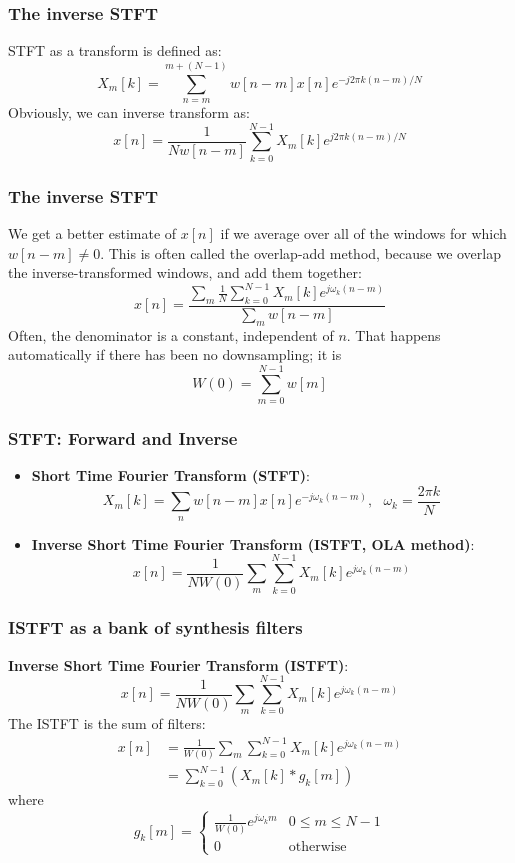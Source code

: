\documentclass{beamer}
\begin{document}
\begin{frame}
  \frametitle{The inverse STFT}
  STFT as a transform is defined as:
  \[
  X_m[k]= \sum_{n=m}^{m+(N-1)} w[n-m]x[n]e^{-j2\pi k(n-m)/N}
  \]
  Obviously, we can inverse transform as:
  \[
  x[n] = \frac{1}{N w[n-m]}\sum_{k=0}^{N-1} X_m[k]e^{j2\pi k(n-m)/N}
  \]
\end{frame}
\begin{frame}
  \frametitle{The inverse STFT}

  We get a better estimate of $x[n]$ if we average over all of the
  windows for which $w[n-m]\ne 0$.  This is often called the
  overlap-add method, because we overlap the inverse-transformed
  windows, and add them together:
  \[
  x[n] = \frac{\sum_m\frac{1}{N}\sum_{k=0}^{N-1} X_m[k]e^{j\omega_k (n-m)}}{\sum_mw[n-m]}
  \]
  Often, the denominator is a constant, independent of $n$.  That
  happens automatically if there has been no downsampling; it is
  \[
  W(0)=\sum_{m=0}^{N-1} w[m]
  \]
\end{frame}

\begin{frame}
  \frametitle{STFT: Forward and Inverse}
  \begin{itemize}
  \item {\bf Short Time Fourier Transform (STFT)}:
    \[
    X_m[k]= \sum_n w[n-m]x[n]e^{-j\omega_k (n-m)},~~~\omega_k=\frac{2\pi k}{N}
    \]
  \item {\bf Inverse Short Time Fourier Transform (ISTFT, OLA method)}:
    \[
    x[n] = \frac{1}{NW(0)}\sum_m\sum_{k=0}^{N-1} X_m[k]e^{j\omega_k (n-m)}
    \]
  \end{itemize}
\end{frame}

\begin{frame}
  \frametitle{ISTFT as a bank of synthesis filters}

  {\bf Inverse Short Time Fourier Transform (ISTFT)}:
  \[
  x[n] = \frac{1}{NW(0)}\sum_m\sum_{k=0}^{N-1} X_m[k]e^{j\omega_k (n-m)}
  \]
  The ISTFT is the sum of filters:
  \begin{align*}
    x[n] &= \frac{1}{W(0)}\sum_m\sum_{k=0}^{N-1} X_m[k]e^{j\omega_k (n-m)}\\
    &= \sum_{k=0}^{N-1} \left( X_m[k] \ast g_k[m]\right)
  \end{align*}
  where
  \[
  g_k[m] = \begin{cases}
    \frac{1}{W(0)}e^{j\omega_k m} & 0\le m\le N-1\\
    0 & \mbox{otherwise}
  \end{cases}
  \]
\end{frame}
\end{document}
